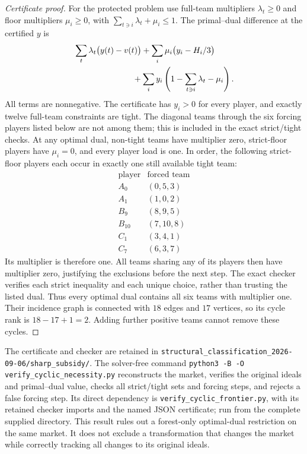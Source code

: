 \documentclass[11pt]{article}
\theoremstyle{remark}
\begin{document}
\begin{proof}[Certificate proof]
For the protected problem use full-team multipliers $\lambda_t\ge0$
and floor multipliers $\mu_i\ge0$, with
$\sum_{t\ni i}\lambda_t+\mu_i\le1$. The primal--dual difference
at the certified $y$ is
\begin{align*}
 &\sum_t\lambda_t\bigl(y(t)-v(t)\bigr)
 +\sum_i\mu_i\bigl(y_i-H_i/3\bigr)\\
 &\hspace{25mm}+\sum_i y_i
                  \left(1-\sum_{t\ni i}\lambda_t-\mu_i\right).
\end{align*}
All terms are nonnegative. The certificate has $y_i>0$ for every
player, and exactly twelve full-team constraints are tight. The diagonal
teams through the six forcing players listed below are not among them;
this is included in the exact strict/tight checks. At any
optimal dual, non-tight teams have multiplier zero, strict-floor
players have $\mu_i=0$, and every player load is one. In order, the
following strict-floor players each occur in exactly one still
available tight team:
\[
\begin{array}{c|c}
 \text{player}&\text{forced team}\\ \hline
 A_0&(0,5,3)\\
 A_1&(1,0,2)\\
 B_9&(8,9,5)\\
 B_{10}&(7,10,8)\\
 C_1&(3,4,1)\\
 C_7&(6,3,7)
\end{array}
\]
Its multiplier is therefore one. All teams sharing any of its players
then have multiplier zero, justifying the exclusions before the next
step. The exact checker verifies each strict inequality and each unique
choice, rather than trusting the listed dual. Thus every optimal dual
contains all six teams with multiplier one. Their incidence graph is
connected with $18$ edges and $17$ vertices, so its cycle rank is
$18-17+1=2$. Adding further positive teams cannot remove these cycles.
\end{proof}
The certificate and checker are retained in
\nolinkurl{structural_classification_2026-09-06/sharp_subsidy/}.
The solver-free command
\texttt{python3 -B -O verify\_cyclic\_necessity.py}
reconstructs the market, verifies the original ideals and primal--dual
value, checks all strict/tight sets and forcing steps, and rejects a
false forcing step. Its direct dependency is
\texttt{verify\_cyclic\_frontier.py}, with its retained checker imports
and the named JSON certificate; run from the complete supplied directory.
This result rules out a forest-only optimal-dual restriction on the
same market. It does not exclude a transformation that changes the
market while correctly tracking all changes to its original ideals.
\end{document}
